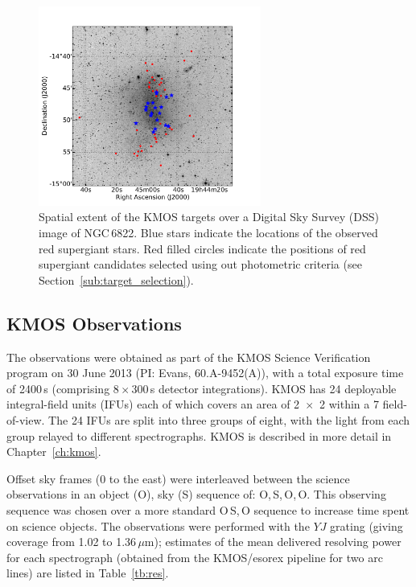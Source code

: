 \begin{figure}
 \centering
 \includegraphics[width=0.65\textwidth]{ngc6822/N6822_RSGs_thesis}
 \caption[Targets identified in on-sky image]{Spatial extent of the KMOS targets over a Digital Sky Survey (DSS) image of NGC\,6822.
          Blue stars indicate the locations of the observed red supergiant stars.
          Red filled circles indicate the positions of red supergiant candidates selected using out photometric criteria (see Section~\ref{sub:target_selection}).
          }
 \label{fig:N6822}
\end{figure}


\subsection{KMOS Observations} %
\label{sub:observations}

The observations were obtained as part of the KMOS Science Verification program on 30 June 2013 (PI: Evans, 60.A-9452(A)),
with a total exposure time of 2400\,s
(comprising 8\,$\times$\,300\,s detector integrations).
KMOS has 24 deployable integral-field units (IFUs) each of which covers an area of
2~$\times$~2 within a 7 field-of-view.
The 24 IFUs are split into three groups of eight, with the light from each group relayed to different spectrographs.
KMOS is described in more detail in Chapter~\ref{ch:kmos}.

Offset sky frames
(0 to the east) were interleaved between the science observations in an object (O), sky (S) sequence of:
O,\,S,\,O,\,O.
This observing sequence was chosen over a more standard O\,S,\,O sequence to increase time spent on science objects.
The observations were performed with the $YJ$ grating
(giving coverage from 1.02 to 1.36\,$\mu$m);
estimates of the mean delivered resolving power for each spectrograph (obtained from the KMOS/esorex pipeline for two arc lines) are listed in Table~\ref{tb:res}.

